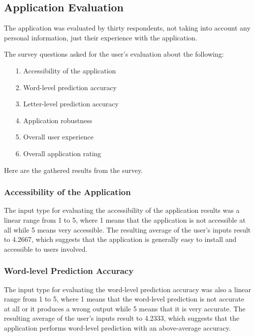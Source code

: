 \documentclass[journal]{./IEEE/IEEEtran}
\begin{document}
\subsection{Application Evaluation}
The application was evaluated by thirty respondents, not taking into account any personal information, just their experience with the application.

The survey questions asked for the user's evaluation about the following:

\begin{enumerate}{}

\item[1.]Accessibility of the application

\item[2.]Word-level prediction accuracy

\item[3.]Letter-level prediction accuracy

\item[4.]Application robustness

\item[5.]Overall user experience

\item[6.]Overall application rating

\end{enumerate}

Here are the gathered results from the survey.

\subsubsection{Accessibility of the Application}

The input type for evaluating the accessibility of the application results was a linear range from 1 to 5, where 1 means that the application is not accessible at all while 5 means very accessible. The resulting average of the user's inputs result to 4.2667, which suggests that the application is generally easy to install and accessible to users involved.

\subsubsection{Word-level Prediction Accuracy}

The input type for evaluating the word-level prediction accuracy was also a linear range from 1 to 5, where 1 means that the word-level prediction is not accurate at all or it produces a wrong output while 5 means that it is very accurate. The resulting average of the user's inputs result to 4.2333, which suggests that the application performs word-level prediction with an above-average accuracy.
\end{document}
